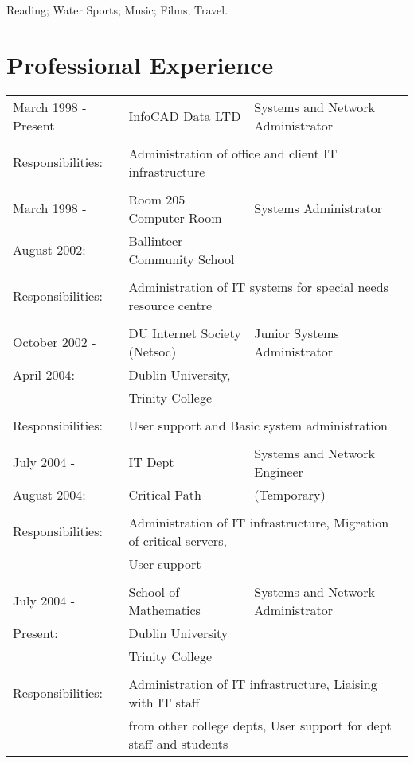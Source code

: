 \documentclass[a4paper, 11pt] {article}
\begin{document}
Reading; Water Sports; Music; Films; Travel.

\section*{Professional Experience}

\begin{tabular}{llll}
March 1998 - Present	&	InfoCAD Data LTD	& Systems and Network Administrator	&	\hspace{10mm}	\\
      	&			&              &            			\\
Responsibilities:	& \multicolumn{3}{l}{Administration of office and client IT infrastructure} 	\\
      				&              						&  &	\\
March 1998 -		& 	Room 205 Computer Room			&	Systems Administrator	& \hspace{10mm}	\\
August 2002:		&  Ballinteer Community School	&	&	\\
						& 		&	\\
Responsibilities:	& \multicolumn{3}{l}{Administration of IT systems for special needs resource centre} 	\\
						&                      				&	&	\\
October 2002 - 	&  DU Internet Society (Netsoc)	&	Junior Systems Administrator	& \hspace{10mm}\\
April 2004:			& 	Dublin University,				&	&	\\
						&  Trinity College					&	&	\\
						& 											&	&	\\
Responsibilities:	& \multicolumn{3}{l}{User support and Basic system administration} 	\\
						&											&	&	\\
July 2004 -			& IT Dept								&	Systems and Network Engineer	& \hspace{10mm}\\
August 2004:		& Critical Path						& (Temporary)	&	\\
						& 											&	&	\\
Responsibilities:	& \multicolumn{3}{l}{Administration of IT infrastructure, Migration of critical servers,}	\\ 
						& \multicolumn{3}{l}{User support} 	\\
						&												&\\
July 2004 -			& 	School of Mathematics	&	Systems and Network Administrator &	\\
Present:				& 	Dublin University			&	&	\\
						& 	Trinity College			&	&	\\
						& 									&	&	\\
Responsibilities:	& \multicolumn{3}{l}{Administration of IT infrastructure, Liaising with IT staff}	\\ 
						& \multicolumn{3}{l}{from other college depts, User support for dept staff and students} 	\\
\end{tabular}
\end{document}
